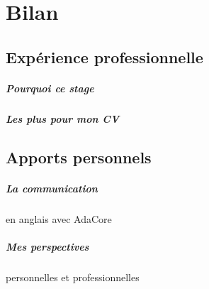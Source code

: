 \chapter{Bilan}

\section*{Expérience professionnelle}
\paragraph{Pourquoi ce stage}
\paragraph{Les plus pour mon CV}

\section*{Apports personnels}
\paragraph{La communication} en anglais avec AdaCore
\paragraph{Mes perspectives} personnelles et professionnelles


